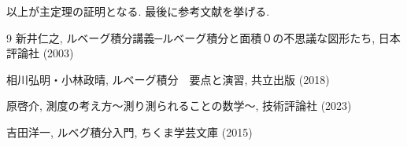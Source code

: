 \documentclass[12pt]{amsart}
\theoremstyle{definiton}
\begin{document}
\bigskip

以上が主定理の証明となる. 最後に参考文献を挙げる.

\bigskip

\begin{thebibliography}{9}
新井仁之, ルベーグ積分講義─ルベーグ積分と面積０の不思議な図形たち, 日本評論社 (2003)

相川弘明・小林政晴, ルベーグ積分　要点と演習, 共立出版 (2018)

原啓介, 測度の考え方～測り測られることの数学～, 技術評論社 (2023)

吉田洋一, ルベグ積分入門, ちくま学芸文庫 (2015)
\end{thebibliography}
\end{document}
